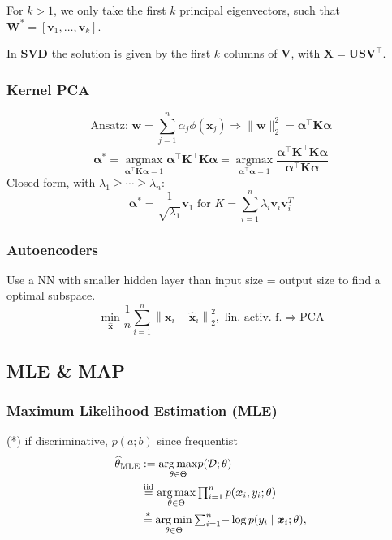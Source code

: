 \documentclass[a4paper,11pt]{article}
\begin{document}
For $k > 1$, we only take the first $k$ principal eigenvectors, such that $\mathbf{W}^*\!=\![\mathbf{v}_1, \ldots, \mathbf{v}_k]$.

In \textbf{SVD} the solution is given by the first $k$ columns of $\mathbf{V}$, with $\mathbf{X}=\mathbf{USV}^\top$.

\subsubsection*{Kernel PCA}
$$\text{Ansatz: } \textstyle \boldsymbol{w}\!=\! \sum_{j=1}^n \alpha_j \phi\left(\boldsymbol{x}_j\right)\Rightarrow \|\boldsymbol{w}\|_2^2 \!=\! \boldsymbol{\alpha}^\top \boldsymbol{K} \boldsymbol{\alpha}$$
$$\textstyle \boldsymbol{\alpha}^*=\underset{{\boldsymbol{\alpha}^\top \boldsymbol{K} \boldsymbol{\alpha}=1}}{\operatorname{argmax}} \boldsymbol{\alpha}^\top \boldsymbol{K}^\top \boldsymbol{K} \boldsymbol{\alpha}=\underset{{\boldsymbol{\alpha}^\top  \boldsymbol{\alpha}=1}}{\operatorname{argmax}} \frac{\boldsymbol{\alpha}^\top \boldsymbol{K}^\top \boldsymbol{K} \boldsymbol{\alpha}}{\boldsymbol{\alpha}^\top \boldsymbol{K} \boldsymbol{\alpha}}$$
Closed form, with $\lambda_1 \geq \cdots \geq \lambda_n$:
$$\textstyle \boldsymbol{\alpha}^*=\frac{1}{\sqrt{\lambda_1}} \boldsymbol{v}_1 \text { for } K=\sum_{i=1}^n \lambda_i \boldsymbol{v}_i \boldsymbol{v}_i^T$$
\subsubsection*{Autoencoders}
Use a NN with smaller hidden layer than input size = output size to find a optimal subspace.
$$\textstyle \min_{\hat{\mathbf{x}}}\frac{1}{n} \sum_{i=1}^n\left\|\mathbf{x}_i-\hat{\mathbf{x}}_i\right\|_2^2, \text{ lin. activ. f.} \Rightarrow \text{PCA}$$  

\subsection*{MLE \& MAP}

\subsubsection*{Maximum Likelihood Estimation (MLE)}
(*) if discriminative, $p(a \mathbf{;} b)$ since frequentist
$$
\begin{aligned}
\widehat{\theta}_{\text{MLE}} &\mathrlap{{}\textstyle:=\underset{\theta \in \Theta}{\arg \max } p(\mathcal{D} ; \theta)} \\
& \textstyle \stackrel{\text{iid}}{=} \underset{\theta \in \Theta}{\arg \max } \prod_{i=1}^n p(\boldsymbol{x}_i, y_i ; \theta) \\
& \textstyle \overset{*}{=}\underset{\theta \in \Theta}{\arg \min } \sum_{i=1}^n \!-\log p(y_i \mid \boldsymbol{x}_i ; \theta),
\end{aligned}
$$
\end{document}
